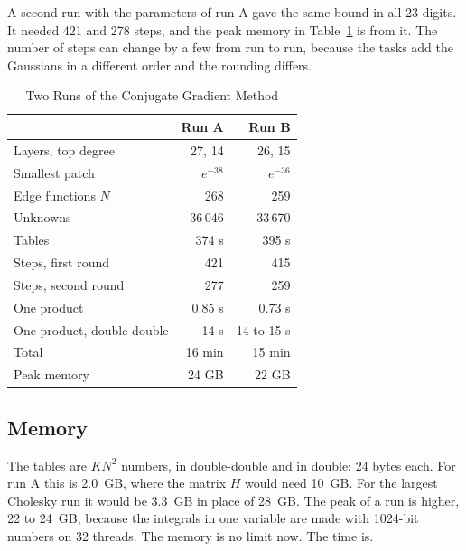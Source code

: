 \documentclass[journal]{IEEEtran}
\begin{document}
A second run with the parameters of run A gave the same bound in all 23 digits. It needed 421 and 278 steps, and the peak memory in Table~\ref{tab:runs} is from it. The number of steps can change by a few from run to run, because the tasks add the Gaussians in a different order and the rounding differs.

\begin{table}[!t]
\caption{Two Runs of the Conjugate Gradient Method}
\label{tab:runs}
\centering
\begin{tabular}{lrr}
\toprule
 & Run A & Run B\\
\midrule
Layers, top degree & 27, 14 & 26, 15\\
Smallest patch & $e^{-38}$ & $e^{-36}$\\
Edge functions $N$ & 268 & 259\\
Unknowns & 36\,046 & 33\,670\\
Tables & 374 s & 395 s\\
Steps, first round & 421 & 415\\
Steps, second round & 277 & 259\\
One product & 0.85 s & 0.73 s\\
One product, double-double & 14 s & 14 to 15 s\\
Total & 16 min & 15 min\\
Peak memory & 24 GB & 22 GB\\
\bottomrule
\end{tabular}
\end{table}

\subsection{Memory}
The tables are $KN^2$ numbers, in double-double and in double: 24 bytes each. For run A this is 2.0~GB, where the matrix $H$ would need 10~GB. For the largest Cholesky run it would be 3.3~GB in place of 28~GB. The peak of a run is higher, 22 to 24~GB, because the integrals in one variable are made with 1024-bit numbers on 32 threads. The memory is no limit now. The time is.
\end{document}
